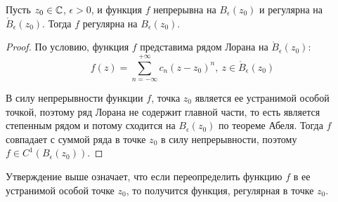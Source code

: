 \begin{proposition}
	Пусть $z_0 \in \mathbb{C}$, $\epsilon > 0$, и функция $f$ непрерывна на $B_\epsilon(z_0)$ и регулярна на $\mathring B_\epsilon(z_0)$. Тогда $f$ регулярна на $B_\epsilon(z_0)$.
\end{proposition}

\begin{proof}
	По условию, функция $f$ представима рядом Лорана на $\mathring B_\epsilon(z_0)$:
	\[f(z) = \sum_{n = -\infty}^{+\infty}c_n(z-z_0)^n,~z \in \mathring B_\epsilon(z_0)\]
	
	В силу непрерывности функции $f$, точка $z_0$ является ее устранимой особой точкой, поэтому ряд Лорана не содержит главной части, то есть является степенным рядом и потому сходится на $B_\epsilon(z_0)$ по теореме Абеля. Тогда $f$ совпадает с суммой ряда в точке $z_0$ в силу непрерывности, поэтому $f \in C^1(B_\epsilon(z_0))$.
\end{proof}

\begin{note}
	Утверждение выше означает, что если переопределить функцию $f$ в ее устранимой особой точке $z_0$, то получится функция, регулярная в точке $z_0$.
\end{note}